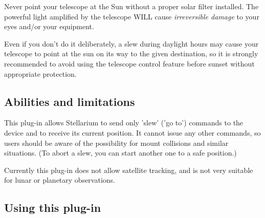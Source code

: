 Never point your telescope at the Sun without a proper solar filter
installed. The powerful light amplified by the telescope WILL cause
\emph{irreversible damage} to your eyes and/or your equipment.

Even if you don't do it deliberately, a slew during daylight hours may
cause your telescope to point at the sun on its way to the given
destination, so it is strongly recommended to avoid using the
telescope control feature before sunset without appropriate
protection.



\subsection{Abilities and limitations}
\label{sec:sec:plugins:TelescopeControl:Limitaitons}

This plug-in allows Stellarium to send only 'slew' ('go to') commands
to the device and to receive its current position. It cannot issue any
other commands, so users should be aware of the possibility for mount
collisions and similar situations. (To abort a slew, you can start
another one to a safe position.)

Currently this plug-in does not allow satellite tracking, and is not
very suitable for lunar or planetary observations.

\subsection{Using this plug-in}
\label{sec:plugins:TelescopeControl:using}

